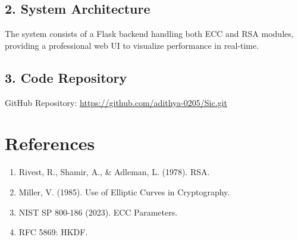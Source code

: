 \documentclass[12pt, a4paper]{report}
\begin{document}
\section{2. System Architecture}
The system consists of a Flask backend handling both ECC and RSA modules, providing a professional web UI to visualize performance in real-time.

\section{3. Code Repository}
GitHub Repository: \url{https://github.com/adithya-0205/Sic.git}

\chapter*{References}
\begin{enumerate}
  \item Rivest, R., Shamir, A., & Adleman, L. (1978). RSA.
  \item Miller, V. (1985). Use of Elliptic Curves in Cryptography.
  \item NIST SP 800-186 (2023). ECC Parameters.
  \item RFC 5869: HKDF.
\end{enumerate}
\end{document}

